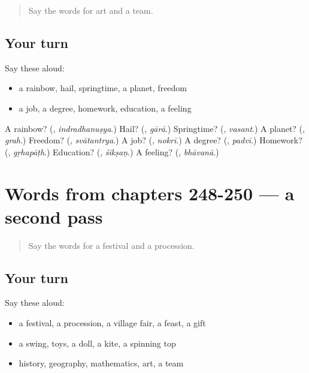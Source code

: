 \label{lesson:MR-R250-first-pass-words-from-chapters-246-247}



\begin{quote}
Say the words for art and a team.
\end{quote}

\subsection*{Your turn}
Say these aloud:

\begin{itemize}
\raggedright
  \item a rainbow, hail, springtime, a planet, freedom
  \item a job, a degree, homework, education, a feeling
\end{itemize}

\begin{tcolorbox}[breakable,colback=teal!4,colframe=teal!35!black,title={Before you move on}]
A rainbow? (\textbf{}, \emph{indradhanuṣya}.) Hail? (\textbf{}, \emph{gārā}.) Springtime? (\textbf{}, \emph{vasant}.) A planet? (\textbf{}, \emph{grah}.) Freedom? (\textbf{}, \emph{svātantrya}.) A job? (\textbf{}, \emph{nokrī}.) A degree? (\textbf{}, \emph{padvī}.) Homework? (\textbf{}, \emph{gṛhapāṭh}.) Education? (\textbf{}, \emph{śikṣaṇ}.) A feeling? (\textbf{}, \emph{bhāvanā}.)
\end{tcolorbox}
\section[(dialogue)]{Words from chapters 248-250 — a second pass}

\label{lesson:MR-R250-second-pass-words-from-chapters-248-250}



\begin{quote}
Say the words for a festival and a procession.
\end{quote}

\subsection*{Your turn}
Say these aloud:

\begin{itemize}
\raggedright
  \item a festival, a procession, a village fair, a feast, a gift
  \item a swing, toys, a doll, a kite, a spinning top
  \item history, geography, mathematics, art, a team
\end{itemize}

